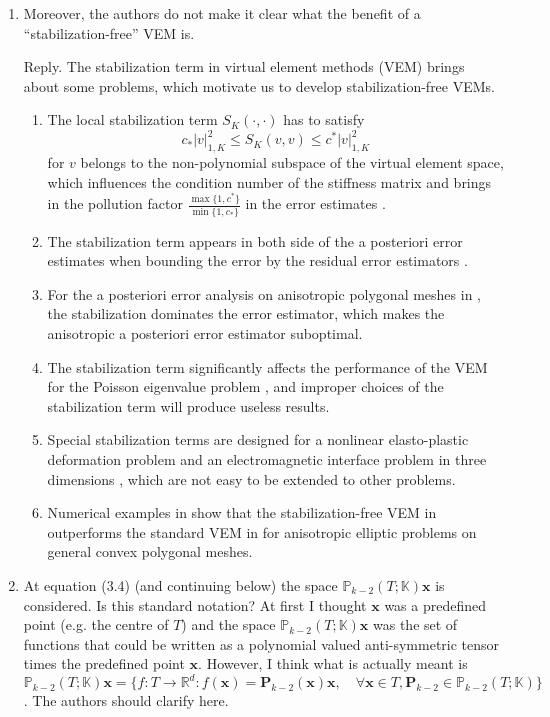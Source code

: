 \documentclass[10pt]{amsart}
\theoremstyle{definition}
\theoremstyle{remark}
\begin{document}
\begin{enumerate}[1.]
\medskip

\item \textsf{Moreover, the authors do not make it clear what the benefit of a “stabilization-free” VEM is.}

\smallskip \noindent \textcolor[rgb]{1.00,0.00,0.00}{Reply.}
The stabilization term in virtual element methods (VEM) brings about some problems, which motivate us to develop stabilization-free VEMs. 
\begin{enumerate}
\item 
The local stabilization term $S_K(\cdot, \cdot)$ has to satisfy 
$$
c_{*} |v|_{1,K}^2\leq S_K(v,v)\leq c^{*} |v|_{1,K}^2 
$$
for $v$ belongs to the non-polynomial subspace of the virtual element space, which influences the condition number of the stiffness matrix and brings in the pollution factor $\frac{\max\{1, c^*\}}{\min\{1, c_*\}}$ in the error estimates \cite{DassiMascotto2018,BeiraodaVeigaDassiRusso2017,Mascotto2018}.  
\item 
The stabilization term appears in both side of the a posteriori error estimates when bounding the error by the residual error estimators \cite{CangianiGeorgoulisPryerSutton2017}.
\item 
For the a posteriori error analysis on anisotropic polygonal meshes in \cite{AntoniettiBerroneBorioDAuriaEtAl2022}, the stabilization dominates the error estimator, which makes the anisotropic a posteriori error estimator suboptimal. 
\item The stabilization term significantly affects the performance of the VEM for the Poisson eigenvalue problem \cite{BoffiGardiniGastaldi2020},
and improper choices of the stabilization term will produce useless results.
\item 
Special stabilization terms are designed for a nonlinear elasto-plastic deformation problem \cite{HudobivnikAldakheelWriggers2019} and an electromagnetic interface problem in three dimensions \cite{CaoChenGuo2023}, which are not easy to be extended to other problems.
\item Numerical examples in \cite{BerroneBorioMarcon2022} show that the stabilization-free VEM in \cite{BerroneBorioMarcon2021} outperforms the standard VEM in \cite{BeiraodaVeigaBrezziMariniRusso2016} for anisotropic elliptic problems on general convex polygonal meshes.
\end{enumerate}

\medskip

\item \textsf{At equation (3.4) (and continuing below) the space $\mathbb P_{k-2}(T;\mathbb K)\boldsymbol{x}$ is considered. Is this standard notation? At first I thought $\boldsymbol{x}$ was a predefined point (e.g. the centre of $T$) and the space $\mathbb P_{k-2}(T;\mathbb K)\boldsymbol{x}$ was the set of functions that could be written as a polynomial valued anti-symmetric tensor times the predefined point $\boldsymbol{x}$. However, I think what is actually meant is $\mathbb P_{k-2}(T;\mathbb K)\boldsymbol{x}=\{f:T\to\mathbb R^d: f(\boldsymbol{x})=\boldsymbol{P}_{k-2}(\boldsymbol{x})\boldsymbol{x},\quad \forall\boldsymbol{x}\in T, \boldsymbol{P}_{k-2}\in \mathbb P_{k-2}(T;\mathbb K)\}$. The authors should clarify here.}


\end{enumerate}
\end{document}
